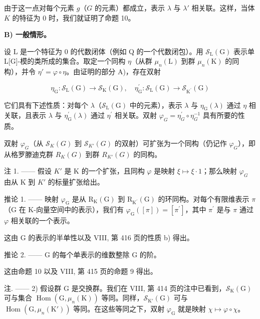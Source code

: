 由于这一点对每个元素 \(g\)（\(G\) 的元素）都成立，表示 \(\lambda\) 与 \(\lambda'\) 相关联。这样，当体 \(K\) 的特征为 0 时，我们就证明了命题 10。

\textbf{B) 一般情形。}

设 L 是一个特征为 0 的代数闭体（例如 Q 的一个代数闭包）。用 \(\mathcal{S}_{\mathrm{L}}(\mathrm{G})\) 表示单 L{[}G{]}-模的类所成的集合。取定一个同构 \(\eta\)（从群 \(\mu_{n}(\mathrm{L})\) 到群 \(\mu_{n}(\mathrm{K})\) 的同构），并令 \(\eta' = \varphi \circ \eta\)。由证明的部分 A)，存在双射

\[
\eta_ {\mathrm{G}}: \mathcal {S} _ {\mathrm{L}} (\mathrm{G}) \to \mathcal {S} _ {\mathrm{K}} (\mathrm{G}), \quad \eta_ {\mathrm{G}} ^ {\prime}: \mathcal {S} _ {\mathrm{L}} (\mathrm{G}) \to \mathcal {S} _ {\mathrm {K^ {\prime}}} (\mathrm{G})
\]

它们具有下述性质：对每个 \(\lambda\)（\(\mathcal{S}_{\mathrm{L}}(\mathrm{G})\) 中的元素），表示 \(\lambda\) 与 \(\eta_{\mathrm{G}}(\lambda)\) 通过 \(\eta\) 相关联，且表示 \(\lambda\) 与 \(\eta_{\mathrm{G}}^{\prime}(\lambda)\) 通过 \(\eta^{\prime}\) 相关联。双射 \(\varphi_{G} = \eta_{G}^{\prime} \circ \eta_{G}^{-1}\) 具有所要的性质。

双射 \(\varphi_{G}\)（从 \(\mathcal{S}_{K}(G)\) 到 \(\mathcal{S}_{K'}(G)\) 的双射）可扩张为一个同构（仍记作 \(\varphi_{G}\)），即从格罗滕迪克群 \(R_{K}(G)\) 到群 \(R_{K'}(G)\) 的同构。

注 1. —— 假设 \(K'\) 是 K 的一个扩张，且同构 \(\varphi\) 是映射 \(\xi \mapsto \xi \cdot 1\)；那么映射 \(\varphi_{G}\) 由从 K 到 \(K'\) 的标量扩张给出。

推论 1. —— 映射 \(\varphi_{\mathrm{G}}\) 是从 \(\mathrm{R}_{\mathrm{K}}(\mathrm{G})\) 到 \(\mathrm{R}_{\mathrm{K}^{\prime}}(\mathrm{G})\) 的环同构。对每个有限维表示 \(\pi\)（\(\mathrm{G}\) 在 K-向量空间中的表示），我们有 \(\varphi_{\mathrm{G}}([\pi]) = [\pi^{\prime}]\)，其中 \(\pi^{\prime}\) 是与 \(\pi\) 通过 \(\varphi\) 相关联的一个表示。

这由 G 的表示的半单性以及 VIII, 第 416 页的性质 b) 得出。

推论 2. —— G 的每个单表示的维数整除 G 的阶。

这由命题 10 以及 VIII, 第 415 页的命题 9 得出。

注. —— 2) 假设群 G 是交换群。我们在 VIII, 第 414 页的注中已看到，\(\mathcal{S}_{\mathrm{K}}(\mathrm{G})\) 可与集合 \(\operatorname{Hom}(\mathrm{G}, \mu_n(\mathrm{K}))\) 等同。同样，\(\mathcal{S}_{\mathrm{K}'}(\mathrm{G})\) 可与 \(\operatorname{Hom}(\mathrm{G}, \mu_n(\mathrm{K}'))\) 等同。在这些等同之下，双射 \(\varphi_{\mathrm{G}}\) 就是映射 \(\chi \mapsto \varphi \circ \chi\)。

